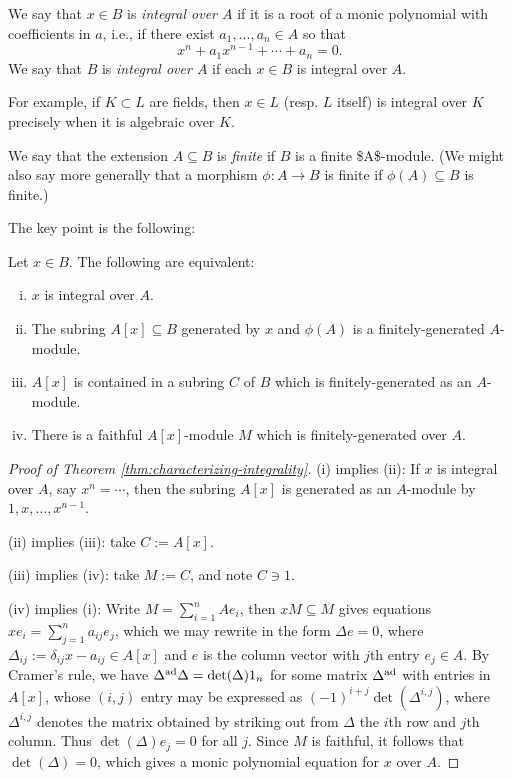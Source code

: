 \documentclass[10pt]{article}
\begin{document}
We say that \(x \in B\) is \emph{integral over $A$}
if it is a root of a monic polynomial with coefficients in \(a\),
i.e., if there exist \(a_1,\dotsc,a_n \in A\)
so that
\[
  x^n + a_1 x^{n-1} + \dotsb + a_n = 0.
  \]
We say that \(B\) is \emph{integral over $A$}
if each \(x \in B\) is integral over \(A\).

For example, if \(K \subset L\) are fields, then \(x \in L\)
(resp. \(L\) itself)
is integral
over \(K\) precisely when it is algebraic over \(K\).


We say that the extension \(A \subseteq B\) is \emph{finite} if \(B\) is a finite \$A\$-module.
(We might also say more generally that a morphism \(\phi : A \rightarrow B\) is finite
if \(\phi(A) \subseteq B\) is finite.)

The key point is the following:
\begin{theorem}\label{thm:characterizing-integrality}
  Let $x \in B$.
  The following are equivalent:
  \begin{enumerate}[(i)]
  \item $x$ is integral over $A$.
  \item The subring $A[x] \subseteq B$
    generated by $x$ and $\phi(A)$
    is a finitely-generated $A$-module.
  \item $A[x]$ is contained in a subring $C$ of $B$
    which is finitely-generated as an $A$-module.
  \item There is a faithful $A[x]$-module $M$
    which is finitely-generated over $A$.
  \end{enumerate}
\end{theorem}

\begin{proof}[Proof of Theorem \ref{thm:characterizing-integrality}]
  (i) implies (ii):
  If $x$ is integral over $A$,
  say $x^n = \dotsb$,
  then the subring $A[x]$ is generated
  as an $A$-module
  by $1, x, \dotsc, x^{n-1}$.

  (ii) implies (iii):
  take $C := A[x]$.

  (iii) implies (iv):
  take $M := C$, and note $C \ni 1$.

  (iv) implies (i):
  Write $M = \sum_{i=1}^n A e_i$,
  then $x M \subseteq M$ gives
  equations
  $x e_i = \sum_{j=1}^n a_{i j} e_j$,
  which we may rewrite in the form
  $\Delta e = 0$,
  where
  $\Delta_{i j} := \delta_{i j} x -  a_{i j} \in A[x]$
  and $e$ is the column vector with $j$th entry $e_j \in A$.
  By Cramer's rule, we have
  $\Delta^{\operatorname{ad}} \Delta = \det(\Delta) 1_n$
  for some matrix $\Delta^{\operatorname{ad}}$ with entries in $A[x]$,
  whose $(i,j)$ entry
  may be expressed as $(-1)^{i+j} \det (\Delta^{i,j})$,
  where $\Delta^{i,j}$ denotes the matrix obtained
  by striking out from $\Delta$ the $i$th row and $j$th column.
  Thus $\det(\Delta) e_j = 0$ for all $j$.
  Since $M$ is faithful,
  it follows that
  $\det(\Delta) = 0$, which gives a monic polynomial equation for $x$ over $A$.
\end{proof}
\end{document}
